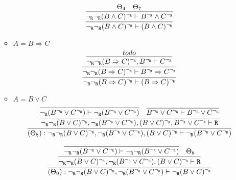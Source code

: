 \begin{enumerate}[(i)]
\begin{itemize}
            $$
                \infer{
                    \ngr\ngr(B \wedge C)^\ngr \vdash (B \wedge C)^\ngr
                }{
                    \infer{
                        \ngr\ngr(B \wedge C)^\ngr \vdash B^\ngr \wedge C^\ngr
                    }{
                        \Theta_4
                        &
                        \Theta_7
                    }
                }
            $$
        \item $A=B \Rightarrow C$
            $$
                \infer{
                    \ngr\ngr (B \Rightarrow C)^\ngr \vdash (B \Rightarrow C)^\ngr
                }{
                    \infer{
                        \ngr\ngr (B \Rightarrow C)^\ngr \vdash B^\ngr \Rightarrow C^\ngr
                    }{
                        \infer{
                            \ngr\ngr (B \Rightarrow C)^\ngr, B^\ngr \vdash C^\ngr
                        }{
                            todo
                        }
                    }
                }
            $$
        \item $A=B \vee C$
            $$            
                    \infer{
                        (\Theta_8) : \ngr\ngr(B \vee C)^\ngr, \ngr(B^\ngr \vee C^\ngr), (B \vee C)^\ngr \vdash \ngr(B^\ngr \vee C^\ngr)
                    }{
                        \infer{
                            \ngr\ngr(B \vee C)^\ngr, \ngr(B^\ngr \vee C^\ngr), (B \vee C)^\ngr, B^\ngr \vee C^\ngr \vdash \R
                        }{
                            \infer{
                                \ngr(B^\ngr \vee C^\ngr) \vdash \ngr(B^\ngr \vee C^\ngr)
                            }{
                            }&
                            \infer{
                                B^\ngr \vee C^\ngr \vdash B^\ngr \vee C^\ngr
                            }{
                            }
                        }
                    }
            $$
            
            $$
            \infer{
                (\Theta_9) : \ngr\ngr(B \vee C)^\ngr, \ngr(B^\ngr \vee C^\ngr) \vdash \ngr(B \vee C)^\ngr
            }{
                \infer{
                    \ngr\ngr(B \vee C)^\ngr, \ngr(B^\ngr \vee C^\ngr), (B \vee C)^\ngr \vdash \R
                }{
                    \infer{
                        \ngr\ngr(B^\ngr \vee C^\ngr) \vdash \ngr\ngr(B^\ngr \vee C^\ngr)
                    }{
                    }&
                    \Theta_8
                }
            }
            $$
        

\end{itemize}
\end{enumerate}
